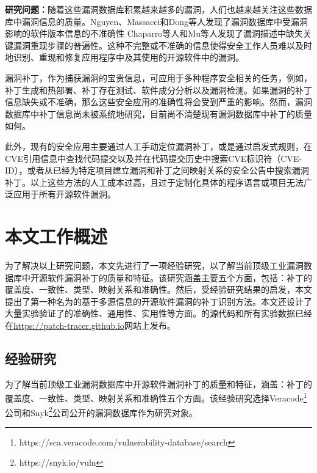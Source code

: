 \textbf{研究问题：}随着这些漏洞数据库积累越来越多的漏洞，人们也越来越关注这些数据库中漏洞信息的质量。Nguyen、Massacci\cite{nguyen2013reliability}和Dong等人\cite{dong2019towards}发现了漏洞数据库中受漏洞影响的软件版本信息的不准确性
Chaparro等人\cite{chaparro2017detecting}和Mu等人\cite{mu2018understanding}发现了漏洞描述中缺失关键漏洞重现步骤的普遍性。这种不完整或不准确的信息使得安全工作人员难以及时地识别、重现和修复应用程序中及其使用的开源软件中的漏洞。

漏洞补丁，作为捕获漏洞的宝贵信息，可应用于多种程序安全相关的任务，例如，补丁生成和热部署\cite{mulliner2013patchdroid,duan2019automating,xu2020automatic}、补丁存在测试\cite{zhang2018precise,jiang2020pdiff,dai2020bscout}、软件成分分析\cite{ponta2020detection,pashchenko2020vuln4real,Wang2020empirical}以及漏洞检测\cite{li2016vulpecker,li2018vuldeepecker,jang2012redebug,kim2017vuddy, xiao2020mvp, cui2020vuldetector}。如果漏洞的补丁信息缺失或不准确，那么这些安全应用的准确性将会受到严重的影响。然而，漏洞数据库中补丁信息尚未被系统地研究，目前尚不清楚现有漏洞数据库中补丁的质量如何。

此外，现有的安全应用主要通过人工手动定位漏洞补丁\cite{xu2020automatic,jiang2020pdiff,dai2020bscout,zhou2017automated,sabetta2018practical,chen2020machine,xiao2020mvp,ponta2020detection,pashchenko2020vuln4real}，或是通过启发式规则，在CVE引用信息中查找代码提交\cite{duan2019automating,li2016vulpecker,li2018vuldeeepecker}以及并在代码提交历史中搜索CVE标识符（CVE-ID）\cite{you2017semfuzz,Wang2020empirical}，或者从已经为特定项目建立漏洞和补丁之间映射关系的安全公告中搜索漏洞补丁\cite{mulliner2013patchdroid,jang2012redebug,kim2017vuddy}。以上这些方法的人工成本过高，且过于定制化具体的程序语言或项目无法广泛应用于所有开源软件漏洞。

\section{本文工作概述}
为了解决以上研究问题，本文先进行了一项经验研究，以了解当前顶级工业漏洞数据库中开源软件漏洞补丁的质量和特征。该研究涵盖主要五个方面，包括：补丁的覆盖度、一致性、类型、映射关系和准确性。然后，受经验研究结果的启发，本文提出了第一种名为\tool 的基于多源信息的开源软件漏洞的补丁识别方法。本文还设计了大量实验验证了\tool 的准确性、通用性、实用性等方面。\tool 的源代码和所有实验数据已经在\url{https://patch-tracer.github.io}网站上发布。

\subsection{经验研究}
为了解当前顶级工业漏洞数据库中开源软件漏洞补丁的质量和特征，涵盖：补丁的覆盖度、一致性、类型、映射关系和准确性五个方面。该经验研究选择Veracode\footnote{https://sca.veracode.com/vulnerability-database/search}公司和Snyk\footnote{https://snyk.io/vuln}公司公开的漏洞数据库作为研究对象。


